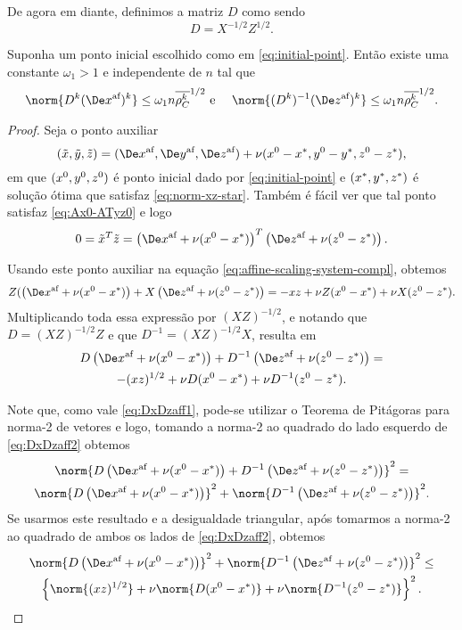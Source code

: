 De agora em diante, definimos a matriz $D$ como sendo
\[
D = X^{-1/2}Z^{1/2}.
\]


\begin{lema}\label{lemma:boundDxDzaff}
	Suponha um ponto inicial escolhido como em \eqref{eq:initial-point}. Então existe uma constante $\omega_1>1$ e  independente de $n$ tal que 
	\begin{equation}
		\norm{D^{k} (\dex)^{k} }\leq \omega_1 n\dbvec{\rho_C^{k}}^{1/2}\text{ e } \quad  \norm{(D^{k})^{-1}(\dez)^{k}}\leq \omega_1 n\dbvec{\rho_C^{k}}^{1/2}.
	\end{equation}
\end{lema}
\begin{proof}
	Seja o ponto auxiliar
	\[
		(\tilde{x},\tilde{y},\tilde{z})  = (\dex,\dey,\dez) + \nu(\xzero - \xstar,\yzero - \ystar,\zzero - \zstar), 
	\]
em que $(x^0,y^0,z^0)$ é ponto inicial dado por \eqref{eq:initial-point} e $(x^*,y^*,z^*)$ é  solução ótima que satisfaz \eqref{eq:norm-xz-star}.
	Também é fácil  ver que tal ponto satisfaz \eqref{eq:Ax0-ATyz0} e logo 
	\begin{equation}
		\label{eq:DxDzaff1}
			 0 = \tilde{x}^{T}\tilde{z} = \left(\dex +  \nu(\xzero - \xstar)\right)^{T}\left(\dez +  \nu(\zzero - \zstar)\right).
	\end{equation}
	

	 Usando este ponto auxiliar na equação \eqref{eq:affine-scaling-system-compl}, obtemos 
	 \[
	 Z(\left(\dex +  \nu(\xzero - \xstar)\right)+ X \left(\dez +  \nu(\zzero - \zstar)\right) = -xz + \nu Z(\xzero - \xstar) + \nu X(\zzero - \zstar).
	 \]
	 Multiplicando toda essa expressão por $(XZ)^{-1/2}$, e notando que $D=(XZ)^{-1/2}Z$ e que $D^{-1}=(XZ)^{-1/2}X$, resulta em 
	\begin{multline}
		\label{eq:DxDzaff2}
		 D\left(\dex +  \nu(\xzero - \xstar)\right)+ D^{-1} \left(\dez +  \nu(\zzero - \zstar)\right) = \\ -(xz)^{1/2} + \nu D(\xzero - \xstar) + \nu D^{-1}(\zzero - \zstar).
		\end{multline}
	 
	 Note que, como vale  \eqref{eq:DxDzaff1}, pode-se utilizar o Teorema de Pitágoras para norma-2 de vetores e logo, tomando a norma-2 ao quadrado do lado esquerdo de \eqref{eq:DxDzaff2} obtemos
	\begin{multline*}
			 	 \norm{D\left(\dex +  \nu(\xzero - \xstar)\right)+ D^{-1} \left(\dez +  \nu(\zzero - \zstar)\right)}^{2} =\\
	 	 	 	 	 \norm{D\left(\dex +  \nu(\xzero - \xstar)\right)}^{2}+ \norm{D^{-1} \left(\dez +  \nu(\zzero - \zstar)\right)}^{2}.
	\end{multline*}
	 Se  usarmos este resultado e a desigualdade triangular, após tomarmos a norma-2 ao quadrado de ambos os lados de \eqref{eq:DxDzaff2}, obtemos 
	 \begin{multline}\label{eq:DxDzaff3}
	 \norm{D\left(\dex +  \nu(\xzero - \xstar)\right)}^{2}+ \norm{D^{-1} \left(\dez +  \nu(\zzero - \zstar)\right)}^{2} \leq \\ 
	 \left\{ \norm{(xz)^{1/2}} + \nu \norm{D(\xzero - \xstar)} + \nu \norm{D^{-1}(\zzero - \zstar)} \right\}^{2}.
	 \end{multline}


\end{proof}
